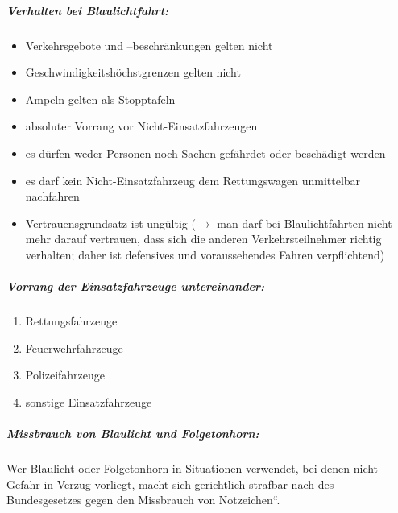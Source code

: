 \subparagraph*{Verhalten bei Blaulichtfahrt:}

\begin{itemize}

	\item {\mdseries
	Verkehrsgebote und --beschränkungen gelten nicht}

	\item {\mdseries
	Geschwindigkeitsh\"ochstgrenzen gelten nicht}

	\item {\mdseries
	Ampeln gelten als Stopptafeln}

	\item {\mdseries
	absoluter Vorrang vor Nicht-Einsatzfahrzeugen}

	\item {\mdseries
	es d\"urfen weder Personen noch Sachen gefährdet oder beschädigt
	werden}

	\item {\mdseries
	es darf kein Nicht-Einsatzfahrzeug dem Rettungswagen unmittelbar
	nachfahren}

	\item {\mdseries
	Vertrauensgrundsatz ist ung\"ultig (${\rightarrow}$ man darf bei
	Blaulichtfahrten nicht mehr darauf vertrauen, dass sich die anderen
	Verkehrsteilnehmer richtig verhalten; daher ist defensives
	und voraussehendes Fahren verpflichtend)}

\end{itemize}

\subparagraph*{Vorrang der Einsatzfahrzeuge untereinander:}

\begin{enumerate}
	\item Rettungsfahrzeuge

	\item Feuerwehrfahrzeuge

	\item Polizeifahrzeuge

	\item sonstige Einsatzfahrzeuge

\end{enumerate}

\subparagraph*{Missbrauch von Blaulicht und Folgetonhorn:}

{\mdseries
Wer Blaulicht oder Folgetonhorn in Situationen verwendet, bei denen
nicht Gefahr in Verzug vorliegt, macht sich gerichtlich strafbar nach
 des {\quotedblbase}Bundesgesetzes gegen
den Missbrauch von Notzeichen{\textquotedblleft}.}

